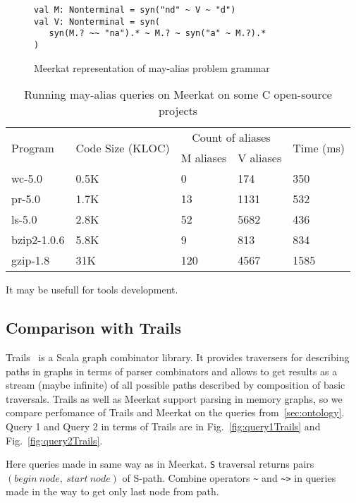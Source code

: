 \begin{figure}[h]
\begin{lstlisting}
val M: Nonterminal = syn("nd" ~ V ~ "d")
val V: Nonterminal = syn(
   syn(M.? ~~ "na").* ~ M.? ~ syn("a" ~ M.?).*
)
\end{lstlisting}
\caption{Meerkat representation of  may-alias problem grammar}
\label{fig:aliasMeerkat}
\end{figure}


\begin{table}[t]
\centering
\begin{tabular}{|l|l|ll|l|}
\hline
\multirow{2}{*}{Program} & \multirow{2}{*}{Code Size (KLOC)} & \multicolumn{2}{c|}{Count of aliases} & \multirow{2}{*}{Time (ms)} \\ \cline{3-4}
 &  & \multicolumn{1}{c|}{M aliases} & \multicolumn{1}{c|}{V aliases} &  \\ 
\hline
\hline
wc-5.0      & 0.5K & 0   & 174  & 350 \\
pr-5.0      & 1.7K & 13  & 1131 & 532 \\
ls-5.0      & 2.8K & 52  & 5682 & 436 \\
bzip2-1.0.6 & 5.8K & 9   & 813  & 834 \\
gzip-1.8    & 31K  & 120 & 4567 & 1585\\
\hline
\end{tabular}
\caption{Running may-alias queries on Meerkat on some C open-source projects}
\label{table:staticAnalysis}
\end{table}

It may be usefull for tools development.

\subsection{Comparison with Trails}

Trails~\cite{ScalaGraphParsing} is a Scala graph combinator library.
It provides traversers for describing paths in graphs in terms of parser combinators and allows to get results as a stream (maybe infinite) of all possible paths described by composition of basic traversals.
Trails as well as Meerkat support parsing in memory graphs, so we compare perfomance of Trails and Meerkat on the queries from~\autoref{sec:ontology}.
Query 1 and Query 2 in terms of Trails are in Fig.~\ref{fig:query1Trails} and Fig.~\ref{fig:query2Trails}.

Here queries made in same way as in Meerkat.
\lstinline{S} traversal returns pairs $(begin\ node,\ start\ node)$ of S-path.
Combine operators \lstinline{~} and \lstinline{~>} in queries made in the way to get only last node from path.


